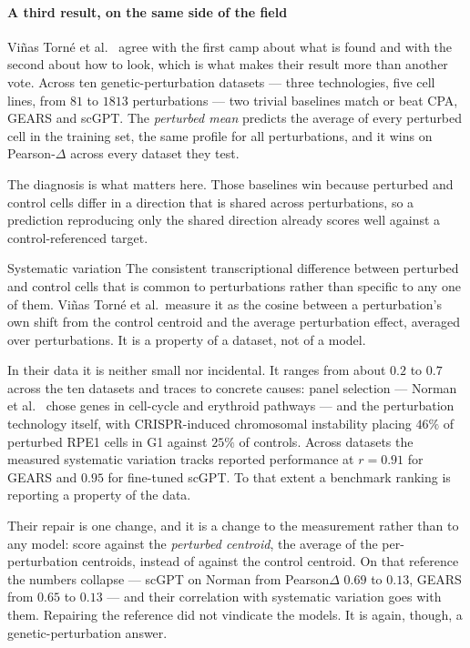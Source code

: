 \paragraph{A third result, on the same side of the field}
Vi\~nas Torn\'e et al.~\cite{systema} agree with the first camp about what is
found and with the second about how to look, which is what makes their result
more than another vote. Across ten genetic-perturbation datasets --- three
technologies, five cell lines, from $81$ to $\num{1813}$ perturbations --- two
trivial baselines match or beat CPA, GEARS and scGPT. The \emph{perturbed mean}
predicts the average of every perturbed cell in the training set, the same
profile for all perturbations, and it wins on Pearson-$\Delta$ across every
dataset they test.

The diagnosis is what matters here. Those baselines win because perturbed and
control cells differ in a direction that is shared across perturbations, so a
prediction reproducing only the shared direction already scores well against a
control-referenced target.

\begin{defn}{Systematic variation}
The consistent transcriptional difference between perturbed and control cells
that is common to perturbations rather than specific to any one of them. Vi\~nas
Torn\'e et al.\ measure it as the cosine between a perturbation's own shift from
the control centroid and the average perturbation effect, averaged over
perturbations. It is a property of a dataset, not of a model.
\end{defn}

In their data it is neither small nor incidental. It ranges from about $0.2$ to
$0.7$ across the ten datasets and traces to concrete causes: panel selection ---
Norman et al.~\cite{norman} chose genes in cell-cycle and erythroid pathways ---
and the perturbation technology itself, with CRISPR-induced chromosomal
instability placing $46\%$ of perturbed RPE1 cells in G1 against $25\%$ of
controls. Across datasets the measured systematic variation tracks reported
performance at $r = 0.91$ for GEARS and $0.95$ for fine-tuned scGPT. To that
extent a benchmark ranking is reporting a property of the data.

Their repair is one change, and it is a change to the measurement rather than to
any model: score against the \emph{perturbed centroid}, the average of the
per-perturbation centroids, instead of against the control centroid. On that
reference the numbers collapse --- scGPT on Norman from Pearson$\Delta$ $0.69$ to
$0.13$, GEARS from $0.65$ to $0.13$ --- and their correlation with systematic
variation goes with them. Repairing the reference did not vindicate the models.
It is again, though, a genetic-perturbation answer.

